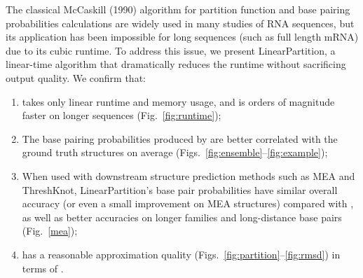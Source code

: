The classical McCaskill (1990) algorithm for partition function and base pairing probabilities calculations 
are widely used in many studies of RNA sequences, 
but its application has been impossible for long sequences 
(such as full length mRNA)
due to its cubic runtime.
To address this issue, we present LinearPartition, a linear-time algorithm that dramatically reduces the runtime without sacrificing output quality. %
We confirm that:
\begin{enumerate}
  \vspace{-0.2cm}
  \setlength{\itemsep}{0pt}
 \item 
 \linearpartition takes only linear runtime and memory usage, and is orders of magnitude faster on longer sequences (Fig.~\ref{fig:runtime}); %
 \item
 The base pairing probabilities produced by \linearpartition are better correlated with the ground truth structures on average (Figs.~\ref{fig:ensemble}--\ref{fig:example}); 
 \item
When used with downstream structure prediction methods such as MEA and ThreshKnot,
  LinearPartition's base pair probabilities have similar overall accuracy (or even a small improvement on MEA structures) compared with \rnafold,
  as well as better accuracies on longer families and long-distance base pairs (Fig.~\ref{mea});
\item
 \linearpartition has a reasonable approximation quality (Figs.~\ref{fig:partition}--\ref{fig:rmsd}) in terms of \RMSD. 
 

\end{enumerate}
